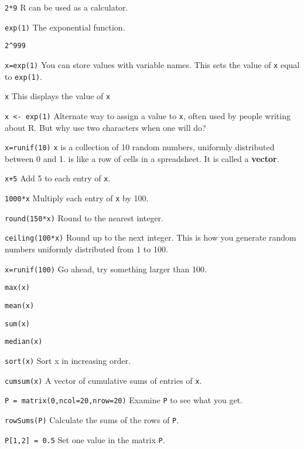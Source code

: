 \blist{-0.05in}
\vspace{-0.1in}
\item {\tt 2*9}       \hfill R can be used as a calculator.
\item {\tt exp(1)} \hfill The exponential function.
\item {\tt 2\^{}999}
\item {\tt x=exp(1)}  \hfill You can store values with variable names.
\new This sets the value of {\tt x} equal to {\tt exp(1)}.
\item {\tt x}         \hfill This displays the value of {\tt x}
\item {\tt x <- exp(1)} \hfill Alternate way to assign a value to {\tt x}, often used by people writing about R.  \new But why use two characters when one will do?
\item {\tt x=runif(10)} \hfill {\tt x} is a collection of 10 random
numbers, uniformly distributed between 0 and 1.  is like a row
of cells in a spreadsheet.  It is called a {\bf vector}.
\item {\tt x+5}       \hfill Add 5 to each entry of {\tt x}.
\item {\tt 1000*x}       \hfill Multiply each entry of {\tt x} by 100.
\item {\tt round(150*x)} \hfill Round to the nearest integer.
\item {\tt ceiling(100*x)} \hfill Round up to the next integer. This is how you generate \new random numbers uniformly distributed from 1 to 100.
\item {\tt x=runif(100)} \hfill Go ahead, try something larger than 100.
\item {\tt max(x)} \hfill
\item {\tt mean(x)} \hfill
\item {\tt sum(x)} \hfill
\item {\tt median(x)} \hfill
\item {\tt sort(x)} \hfill Sort x in increasing order.
\item {\tt cumsum(x)} \hfill A vector of cumulative sums of entries of {\tt x}.
\item {\tt P = matrix(0,ncol=20,nrow=20)} \hfill Examine {\tt P} to see what you get.
\item {\tt rowSums(P)} \hfill Calculate the sums of the rows of {\tt P}.
\item {\tt P[1,2] = 0.5} \hfill Set one value in the matrix {\tt P}.

